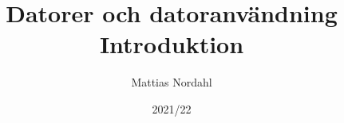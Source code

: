 \documentclass[trans]{beamer}
\author[]{Mattias Nordahl}
\institute{\url{mattias.nordahl@cs.lth.se}}
\date{}
\begin{document}
 

\title{Datorer och datoranvändning\\Introduktion} 

\frame[plain]{
\maketitle

\vspace{-2\baselineskip}
}

\date{2021/22} 


\end{document}

